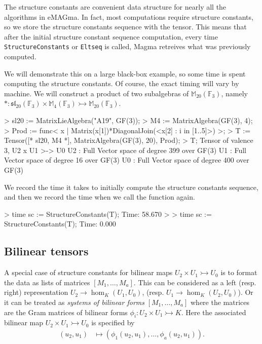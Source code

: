 \begin{example}[SCStored]

The structure constants are convenient data structure for nearly all the algorithms in eMAGma. 
In fact, most computations require structure constants, so we store the structure constants sequence with the tensor. 
This means that after the initial structure constant sequence computation, every time {\tt StructureConstants} or {\tt Eltseq} is called, Magma retreives what was previously computed. 

We will demonstrate this on a large black-box example, so some time is spent computing the structure constants. 
Of course, the exact timing will vary by machine.
We will construct a product of two subalgebras of $\mathbb{M}_{20}(\mathbb{F}_3)$, namely $* : \mathfrak{sl}_{20}(\mathbb{F}_3)\times \mathbb{M}_4(\mathbb{F}_3)\rightarrowtail \mathbb{M}_{20}(\mathbb{F}_3)$.

\begin{code}
> sl20 := MatrixLieAlgebra("A19", GF(3));
> M4 := MatrixAlgebra(GF(3), 4);
> Prod := func< x | Matrix(x[1])*DiagonalJoin(<x[2] : i in [1..5]>) >;
> T := Tensor([* sl20, M4 *], MatrixAlgebra(GF(3), 20), Prod);
> T;
Tensor of valence 3, U2 x U1 >-> U0
U2 : Full Vector space of degree 399 over GF(3)
U1 : Full Vector space of degree 16 over GF(3)
U0 : Full Vector space of degree 400 over GF(3)
\end{code}

We record the time it takes to initially compute the structure constants sequence, and then we record the time when we call the function again.
\begin{code}
> time sc := StructureConstants(T);
Time: 58.670
> 
> time sc := StructureConstants(T);
Time: 0.000
\end{code}
\end{example}





\subsection{Bilinear tensors}
A special case of structure constants for bilinear maps $U_2\times U_1\rightarrowtail U_0$
is to format the data as lists of matrices $[M_1,\dots, M_a]$.
This can be considered as a left (resp. right) representation
$U_2\to \hom_K(U_1,U_0)$, (resp. $U_1\to \hom_K(U_2,U_0)$).  
Or it can be treated as {\em systems of bilinear forms} 
$[M_1,\dots,M_a]$ where the matrices are the Gram matrices of bilinear forms $\phi_i:U_2\times U_1\rightarrowtail K$.
Here the associated bilinear map $U_2\times U_1\rightarrowtail U_0$ is 
specified by
\begin{align*}
	(u_2,u_1) & \mapsto ( \phi_1(u_2,u_1),\dots, \phi_a(u_2,u_1)).
\end{align*}

